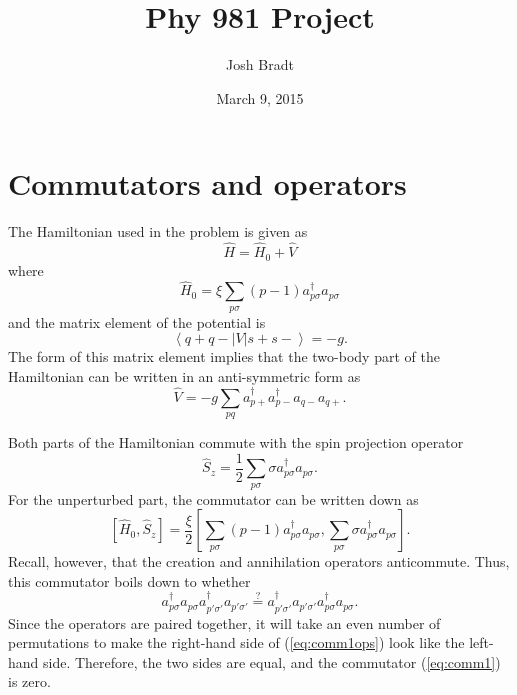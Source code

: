 \documentclass{article}
\title{Phy 981 Project}
\author{Josh Bradt}
\date{March 9, 2015}
\newcommand{\mel}[3]{\ensuremath{\left<#1 \right|\! #2 \!\left| #3 \right>}}
\begin{document}
\maketitle

\section{Commutators and operators}
	
	The Hamiltonian used in the problem is given as
	\begin{equation*}
		\hat H = \hat H_0 + \hat V
	\end{equation*}
	where
	\begin{equation}
		\hat H_0 = \xi \sum_{p\sigma} (p-1) a_{p\sigma}^\dagger a_{p\sigma}
	\end{equation}
	and the matrix element of the potential is
	\begin{equation}
		\mel{q+q-}{V}{s+s-} = -g.  \label{eq:potelmnt}
	\end{equation}
	The form of this matrix element implies that the two-body part of the Hamiltonian can be written in an anti-symmetric form as
	\begin{equation}
		\hat V = -g \sum_{pq} a^\dagger_{p+} a^\dagger_{p-} a_{q-} a_{q+}.
	\end{equation}

	Both parts of the Hamiltonian commute with the spin projection operator
	\begin{equation*}
		\hat S_z = \frac{1}{2} \sum_{p\sigma} \sigma a^\dagger_{p\sigma} a_{p\sigma}.
	\end{equation*}
	For the unperturbed part, the commutator can be written down as
	\begin{equation}
		\left[\hat H_0, \hat S_z \right] = \frac{\xi}{2} \left[ \sum_{p\sigma} (p-1) a_{p\sigma}^\dagger a_{p\sigma}, \sum_{p\sigma} \sigma a^\dagger_{p\sigma} a_{p\sigma} \right]. \label{eq:comm1}
	\end{equation}
	Recall, however, that the creation and annihilation operators anticommute. Thus, this commutator boils down to whether
	\begin{equation}
		a^\dagger_{p\sigma} a_{p\sigma} a^\dagger_{p'\sigma'} a_{p'\sigma'} \stackrel{?}{=} a^\dagger_{p'\sigma'} a_{p'\sigma'} a^\dagger_{p\sigma} a_{p\sigma}. \label{eq:comm1ops}
	\end{equation}
	Since the operators are paired together, it will take an even number of permutations to make the right-hand side of (\ref{eq:comm1ops}) look like the left-hand side. Therefore, the two sides are equal, and the commutator (\ref{eq:comm1}) is zero.
\end{document}

